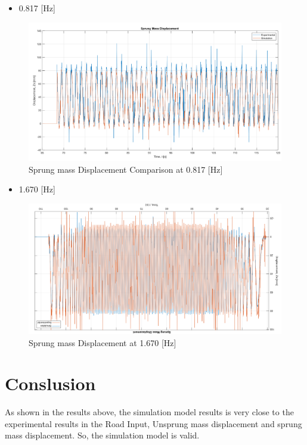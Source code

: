 \begin{itemize}
	\item 0.817 [Hz]
\end{itemize}
\begin{figure}[H]
	\centering
	\includegraphics[width=0.99\linewidth]{figures/0.817 S.png}
	\caption{Sprung mass Displacement Comparison at 0.817 [Hz]}
	\label{fig:Sprung mass Displacement Comparison at 0.817}
\end{figure}

\begin{itemize}
	\item 1.670 [Hz]
\end{itemize}
\begin{figure}[H]
	\centering
	\includegraphics[width=0.99\linewidth]{figures/1.67 S.png}
	\caption{Sprung mass Displacement at 1.670 [Hz]}
	\label{fig:Sprung mass Displacement Comparison at 1.670}
\end{figure}

\section{Conslusion}

As shown in the results above, the simulation model results is very close to the experimental results in the Road Input, Unsprung mass displacement and sprung mass displacement.
\newline
So, the simulation model is valid.
\fi